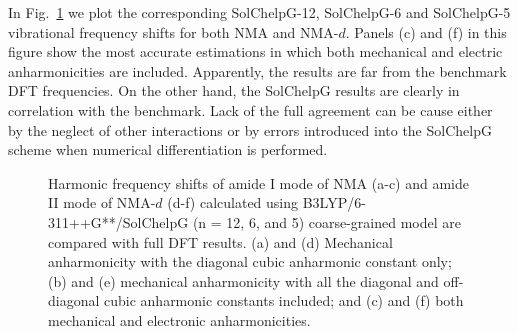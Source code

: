 \documentclass[a4paper,titlepage,twoside,fleqn,12pt]{book}
\begin{document}
\begin{refsection}
In Fig.~\ref{f:solchelpg} we plot the corresponding SolChelpG-12, SolChelpG-6 and
SolChelpG-5 vibrational frequency shifts for both NMA and NMA-$d$.
Panels (c) and (f) in this figure show the most accurate estimations
in which both mechanical and electric anharmonicities are included.
Apparently, the results are far from the benchmark DFT frequencies.
On the other hand, the SolChelpG results are clearly in correlation
with the benchmark. Lack of the full agreement can be cause either
by the neglect of other interactions or by errors introduced into
the SolChelpG scheme when numerical differentiation is performed.
%
\begin{figure}[t!]
\centering
\setlength\fboxsep{0.4pt}
\setlength\fboxrule{0.5pt}
\caption{
Harmonic frequency shifts of amide I mode of NMA (a-c) and amide II mode
of NMA-$d$ (d-f) calculated using
B3LYP/6-311++G**/SolChelpG (n = 12, 6, and 5) coarse\hyp{}grained model
are compared with full DFT results. (a) and (d) Mechanical anharmonicity with the
diagonal cubic anharmonic constant only; (b) and (e) mechanical anharmonicity with
all the diagonal and off\hyp{}diagonal cubic anharmonic constants included; and
(c) and (f) both mechanical and electronic anharmonicities.
\label{f:solchelpg}}
\end{figure}
%


\end{refsection}
\end{document}
